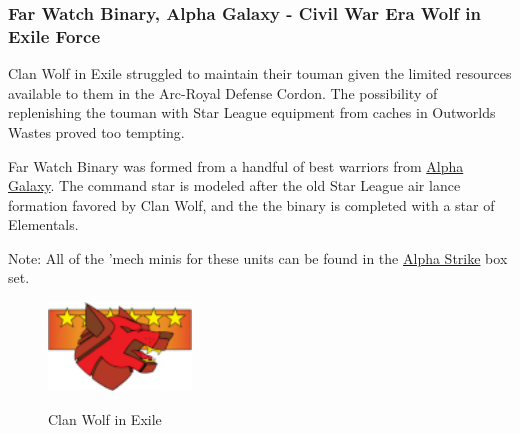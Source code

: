 \subsubsection{Far Watch Binary, Alpha Galaxy - Civil War Era Wolf in Exile Force}

Clan Wolf in Exile struggled to maintain their touman given the limited resources available to them in the Arc-Royal Defense Cordon.
The possibility of replenishing the touman with Star League equipment from caches in Outworlds Wastes proved too tempting.

Far Watch Binary was formed from a handful of best warriors from \href{https://www.sarna.net/wiki/Alpha_Galaxy_(Clan_Wolf-in-Exile)}{Alpha Galaxy}.
The command star is modeled after the old Star League air lance formation favored by Clan Wolf, and the the binary is completed with a star of Elementals.
          	
Note: All of the 'mech minis for these units can be found in the \href{https://www.sarna.net/wiki/Alpha_Strike_Boxed_Set}{Alpha Strike} box set. 

\begin{figure}[!h]
  \centering
  \includegraphics[alt='Clan Wolf in Exile Logo', width=1.5in, height=0.931in]{img/Wolf.png}
  \caption*{Clan Wolf in Exile}
\end{figure}

